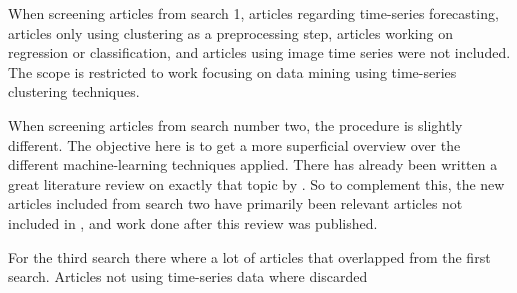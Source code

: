 When screening articles from search 1, articles regarding time-series forecasting, articles only using clustering as a preprocessing step, articles working on regression or classification, and articles using image time series were not included. The scope is restricted to work focusing on data mining using time-series clustering techniques. \bigskip

When screening articles from search number two, the procedure is slightly different. The objective here is to get a more superficial overview over the different machine-learning techniques applied. There has already been written a great literature review on exactly that topic by \textcite{ml_for_wt_cond_monit_rev}. So to complement this, the new articles included from search two have primarily been relevant articles not included in \cite{ml_for_wt_cond_monit_rev}, and work done after this review was published.

For the third search there where a lot of articles that overlapped from the first search. Articles not using time-series data where discarded